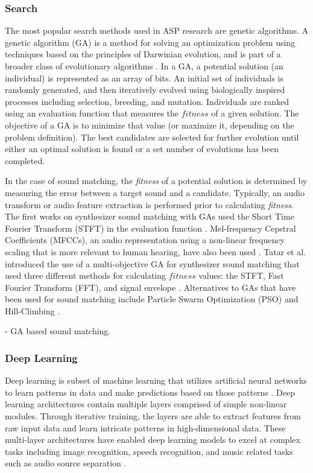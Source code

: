 \subsubsection{Search}
The most popular search methods used in ASP research are genetic algorithms. A genetic algorithm (GA) is a method for solving an optimization problem using techniques based on the principles of Darwinian evolution, and is part of a broader class of evolutionary algorithms \cite{whitley1994genetic}. In a GA, a potential solution (an individual) is represented as an array of bits. An initial set of individuals is randomly generated, and then iteratively evolved using biologically inspired processes including selection, breeding, and mutation. Individuals are ranked using an evaluation function that measures the $fitness$ of a given solution. The objective of a GA is to minimize that value (or maximize it, depending on the problem definition). The best candidates are selected for further evolution until either an optimal solution is found or a set number of evolutions has been completed.

In the case of sound matching, the \textit{fitness} of a potential solution is determined by measuring the error between a target sound and a candidate. Typically, an audio transform or audio feature extraction is performed prior to calculating \textit{fitness}. The first works on synthesizer sound matching with GAs used the Short Time Fourier Transform (STFT) in the evaluation function \cite{horner1993machine, horner1995wavetable}. Mel-frequency Cepstral Coefficients (MFCCs), an audio representation using a non-linear frequency scaling that is more relevant to human hearing, have also been used \cite{yee2008synthbot, roth2011comparison, macret2014automatic, smith2017play}. Tatar et al. introduced the use of a multi-objective GA for synthesizer sound matching that used three different methods for calculating $fitness$ values: the STFT, Fast Fourier Transform (FFT), and signal envelope \cite{tatar2016automatic}. Alternatives to GAs that have been used for sound matching include Particle Swarm Optimization (PSO) \cite{heise2009automatic} and Hill-Climbing \cite{roth2011comparison, luke2019stochastic}.

\cite{masudo2021quality} - GA based sound matching.

\subsubsection{Deep Learning}
Deep learning is subset of machine learning that utilizes artificial neural networks to learn patterns in data and make predictions based on those patterns \cite{lecun2015deep}. Deep learning architectures contain multiple layers comprised of simple non-linear modules. Through iterative training, the layers are able to extract features from raw input data and learn intricate patterns in high-dimensional data. These multi-layer architectures have enabled deep learning models to excel at complex tasks including image recognition, speech recognition, and music related tasks such as audio source separation \cite{spleeter2019}.

